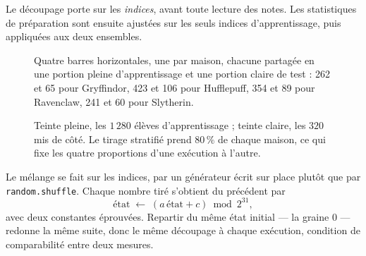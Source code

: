 Le découpage porte sur les \emph{indices}, avant toute lecture des notes. Les
statistiques de préparation sont ensuite ajustées sur les seuls indices
d'apprentissage, puis appliquées aux deux ensembles.

\begin{figure}[htbp]
\centering
\begin{graphique}{Quatre barres horizontales, une par maison, chacune partagée en une portion pleine d'apprentissage et une portion claire de test : 262 et 65 pour Gryffindor, 423 et 106 pour Hufflepuff, 354 et 89 pour Ravenclaw, 241 et 60 pour Slytherin.}
\end{graphique}
\caption{Teinte pleine, les $1\,280$ élèves d'apprentissage ; teinte claire, les
$320$ mis de côté. Le tirage stratifié prend $80\,\%$ de chaque maison, ce qui
fixe les quatre proportions d'une exécution à l'autre.}
\label{fig:decoupe}
\end{figure}
\FloatBarrier

Le mélange se fait sur les indices, par un générateur écrit sur place plutôt
que par \texttt{random.}\allowbreak\texttt{shuffle}. Chaque nombre tiré s'obtient du précédent par
\[
  \text{\'etat}\;\longleftarrow\;(a\,\text{\'etat}+c)\bmod 2^{31},
\]
avec deux constantes éprouvées. Repartir du même état initial --- la graine $0$
--- redonne la même suite, donc le même découpage à chaque exécution, condition
de comparabilité entre deux mesures.


